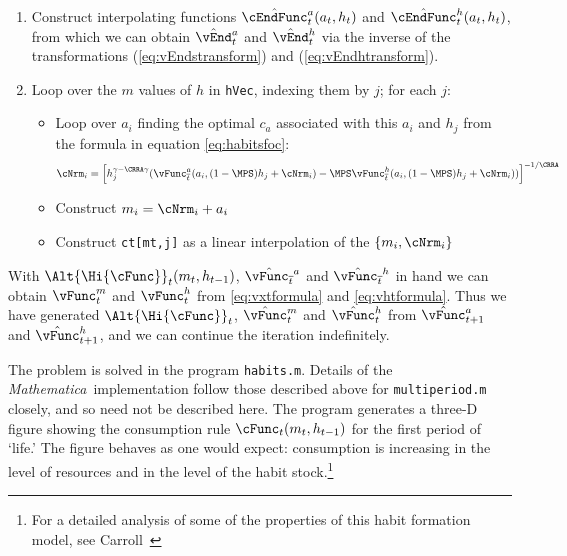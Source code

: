 \documentclass[titlepage, headings=optiontotocandhead]{\econtex}
\newcommand{\Mma}{\textit{Mathematica}}
\begin{document}
{\begin{enumerate}
  \item Construct interpolating functions $\hat{\cEndFunc}^{a}_{t}({a}_{t},h_{t})$
    and $\hat{\cEndFunc}^{h}_{t}({a}_{t},h_{t})$, from which we can
    obtain $\hat{\vEnd}^{a}_{t}$ and $\hat{\vEnd}^{h}_{t}$
    via the inverse of the transformations (\ref{eq:vEndstransform})
    and (\ref{eq:vEndhtransform}).

  \item Loop over the $m$ values of $h$ in \texttt{hVec}, indexing them
    by $j$; for each $j$:
    \begin{itemize}
    \item Loop over ${a}_{i}$ finding the optimal ${c}_{a}$ associated
      with this ${a}_{i}$ and $h_{j}$ from the formula in equation
      \eqref{eq:habitsfoc}:
      \begin{equation}
        {\cNrm}_{i} = \left[h_{j}^{\gamma-\CRRA \gamma}
          (\vEOPt^{{a}}({a}_{i},(1-\MPS) h_{j}+ {\cNrm}_{i})
          -\MPS \vEOPt^{h}({a}_{i},(1-\MPS)
          h_{j}+{\cNrm}_{i}))\right]^{-1/\CRRA} \nonumber
      \end{equation}

    \item Construct ${m}_{i} = {\cNrm}_{i}+{a}_{i}$

    \item Construct \texttt{ct[mt,j]} as a linear interpolation of the
      $\{{m}_{i},{\cNrm}_{i}\}$
    \end{itemize}
  \end{enumerate}

  With $\Alt{\Hi{\cFunc}}_{t}({m}_{t},h_{t-1})$, $\hat{\vEOPt}^{{a}}$
  and $\hat{\vEOPt}^{h}$ in hand we can obtain ${\vFunc}^{m}_{t}$
  and ${\vFunc}^{h}_{t}$ from \eqref{eq:vxtformula} and
  \eqref{eq:vhtformula}. Thus we have generated $\Alt{\Hi{\cFunc}}_{t}$,
  $\hat{\vFunc}^{m}_{t}$ and $\hat{\vFunc}^{h}_{t}$ from $\hat{\vFunc}^{a}_{t+1}$ and
  $\hat{\vFunc}^{h}_{t+1}$, and we can continue the iteration indefinitely.

  The problem is solved in the program \texttt{habits.m}.  Details of
  the {\Mma}~implementation follow those described above for
  \texttt{multiperiod.m} closely, and so need not be described here.
  The program generates a three-D figure showing the consumption rule
  $\cFunc_{t}({m}_{t},h_{t-1})$ for the first period of `life.'  The figure
  behaves as one would expect: consumption is increasing in the level
  of resources and in the level of the habit stock.\footnote{For a
    detailed analysis of some of the properties of this habit formation
    model, see Carroll~\citeyearpar{carroll:RiskyHabits}}


}{}
\end{document}
